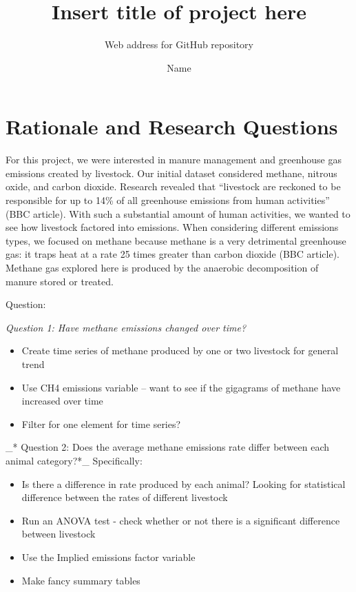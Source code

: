 \documentclass[
  12pt,
]{article}
\title{Insert title of project here}
\subtitle{Web address for GitHub repository}
\author{Name}
\date{}
\providecommand{\tightlist}{%
  \setlength{\itemsep}{0pt}\setlength{\parskip}{0pt}}
\begin{document}
\maketitle

\newpage
\tableofcontents 
\newpage
\listoftables 
\newpage
\listoffigures 
\newpage

\hypertarget{rationale-and-research-questions}{%
\section{Rationale and Research
Questions}\label{rationale-and-research-questions}}

For this project, we were interested in manure management and greenhouse
gas emissions created by livestock. Our initial dataset considered
methane, nitrous oxide, and carbon dioxide. Research revealed that
``livestock are reckoned to be responsible for up to 14\% of all
greenhouse emissions from human activities'' (BBC article). With such a
substantial amount of human activities, we wanted to see how livestock
factored into emissions. When considering different emissions types, we
focused on methane because methane is a very detrimental greenhouse gas:
it traps heat at a rate 25 times greater than carbon dioxide (BBC
article). Methane gas explored here is produced by the anaerobic
decomposition of manure stored or treated.

Question:

\emph{\emph{Question 1: Have methane emissions changed over time?}}

\begin{itemize}
\tightlist
\item
  Create time series of methane produced by one or two livestock for
  general trend
\item
  Use CH4 emissions variable -- want to see if the gigagrams of methane
  have increased over time
\item
  Filter for one element for time series?
\end{itemize}

\_* Question 2: Does the average methane emissions rate differ between
each animal category?*\_ Specifically:

\begin{itemize}
\tightlist
\item
  Is there a difference in rate produced by each animal? Looking for
  statistical difference between the rates of different livestock
\item
  Run an ANOVA test - check whether or not there is a significant
  difference between livestock
\item
  Use the Implied emissions factor variable
\item
  Make fancy summary tables
\end{itemize}
\end{document}
